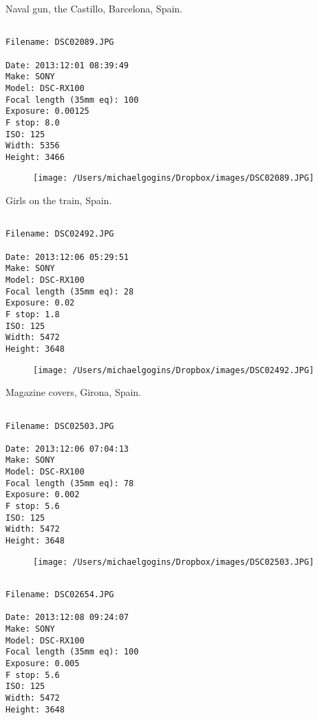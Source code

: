 \clearpage
\onecolumn
\noindent Naval gun, the Castillo, Barcelona, Spain.
\noindent
\begin{lstlisting}

Filename: DSC02089.JPG

Date: 2013:12:01 08:39:49
Make: SONY
Model: DSC-RX100
Focal length (35mm eq): 100
Exposure: 0.00125
F stop: 8.0
ISO: 125
Width: 5356
Height: 3466
\end{lstlisting}
\clearpage

\begin{figure}
\texttt{[image: /Users/michaelgogins/Dropbox/images/DSC02089.JPG]}
\end{figure}
    
\clearpage
\onecolumn
\noindent Girls on the train, Spain.
\noindent
\begin{lstlisting}

Filename: DSC02492.JPG

Date: 2013:12:06 05:29:51
Make: SONY
Model: DSC-RX100
Focal length (35mm eq): 28
Exposure: 0.02
F stop: 1.8
ISO: 125
Width: 5472
Height: 3648
\end{lstlisting}
\clearpage

\begin{figure}
\texttt{[image: /Users/michaelgogins/Dropbox/images/DSC02492.JPG]}
\end{figure}
    
\clearpage
\onecolumn
\noindent Magazine covers, Girona, Spain.
\noindent
\begin{lstlisting}

Filename: DSC02503.JPG

Date: 2013:12:06 07:04:13
Make: SONY
Model: DSC-RX100
Focal length (35mm eq): 78
Exposure: 0.002
F stop: 5.6
ISO: 125
Width: 5472
Height: 3648
\end{lstlisting}
\clearpage

\begin{figure}
\texttt{[image: /Users/michaelgogins/Dropbox/images/DSC02503.JPG]}
\end{figure}
    
\clearpage
\onecolumn
\noindent 
\noindent
\begin{lstlisting}

Filename: DSC02654.JPG

Date: 2013:12:08 09:24:07
Make: SONY
Model: DSC-RX100
Focal length (35mm eq): 100
Exposure: 0.005
F stop: 5.6
ISO: 125
Width: 5472
Height: 3648
\end{lstlisting}
\clearpage


